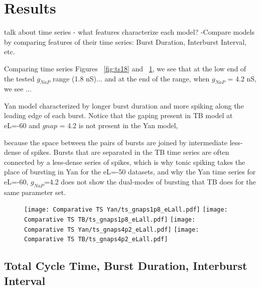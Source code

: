 \documentclass[11pt]{article}
\begin{document}
\oddsidemargin -0.22in
\evensidemargin -0.22in
\topmargin 0.05in
\topskip 0.25in
\headheight 0.05in
\headsep 0.25in

\graphicspath{{"../Data and Analysis/long TB Yan/plots/"}{"../Data and Analysis/short TB Yan/plots/"}}

\FloatBarrier
\section{Results}
talk about time series - what features characterize each model?
-Compare models by comparing features of their time series: Burst Duration, Interburst Interval, etc. 

Comparing time series Figures ~\ref{fig:ts18} and ~\ref{fig:ts42}, we see that at the low end of the tested $g_{NaP}$ range (1.8 nS)...
and at the end of the range, when $g_{NaP}$ = 4.2 nS, we see ...

Yan model characterized by longer burst duration and more spiking along the leading edge of each burst. Notice that the gaping present in TB model at eL=-60 and $gnap$ = 4.2 is not present in the Yan model, 

because the space between the pairs of bursts are joined by intermediate less-dense of spikes.
Bursts that are separated in the TB time series are often connected by a less-dense series of spikes, which is why tonic spiking takes the place of bursting in Yan for the eL=-50 datasets, and why the Yan time series for eL=-60, $g_{NaP}$=4.2 does not show the dual-modes of bursting that TB does for the same parameter set.


\begin{figure}[h]
	\centering
	\texttt{[image: Comparative TS Yan/ts\_gnaps1p8\_eLall.pdf]}
	\texttt{[image: Comparative TS TB/ts\_gnaps1p8\_eLall.pdf]}
	\texttt{[image: Comparative TS Yan/ts\_gnaps4p2\_eLall.pdf]}
	\texttt{[image: Comparative TS TB/ts\_gnaps4p2\_eLall.pdf]}
	\label{fig:ts42}
\end{figure}

\subsection{Total Cycle Time, Burst Duration, Interburst Interval}
\end{document}

